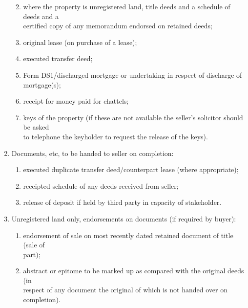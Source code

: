 \documentclass[
]{article}
\providecommand{\tightlist}{%
  \setlength{\itemsep}{0pt}\setlength{\parskip}{0pt}}
\begin{document}
\begin{enumerate}
  \begin{enumerate}
  \def\labelenumii{(\alph{enumii})}
  \tightlist
  \item
    where the property is unregistered land, title deeds and a schedule
    of deeds and a\\
    certified copy of any memorandum endorsed on retained deeds;\\
  \item
    original lease (on purchase of a lease);\\
  \item
    executed transfer deed;\\
  \item
    Form DS1/discharged mortgage or undertaking in respect of discharge
    of\\
    mortgage(s);\\
  \item
    receipt for money paid for chattels;\\
  \item
    keys of the property (if these are not available the seller's
    solicitor should be asked\\
    to telephone the keyholder to request the release of the keys).
  \end{enumerate}
\item
  Documents, etc, to be handed to seller on completion:

  \begin{enumerate}
  \def\labelenumii{(\alph{enumii})}
  \tightlist
  \item
    executed duplicate transfer deed/counterpart lease (where
    appropriate);\\
  \item
    receipted schedule of any deeds received from seller;\\
  \item
    release of deposit if held by third party in capacity of
    stakeholder.
  \end{enumerate}
\item
  Unregistered land only, endorsements on documents (if required by
  buyer):

  \begin{enumerate}
  \def\labelenumii{(\alph{enumii})}
  \tightlist
  \item
    endorsement of sale on most recently dated retained document of
    title (sale of\\
    part);\\
  \item
    abstract or epitome to be marked up as compared with the original
    deeds (in\\
    respect of any document the original of which is not handed over on
    completion).
  \end{enumerate}
\end{enumerate}
\end{document}
